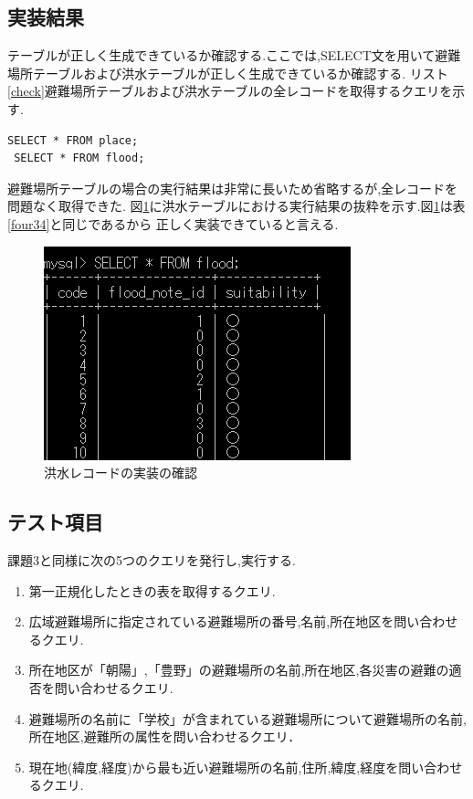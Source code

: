 \documentclass[a4j]{jarticle}
\begin{document}
    \subsection{実装結果}
    テーブルが正しく生成できているか確認する.ここでは,SELECT文を用いて避難場所テーブルおよび洪水テーブルが正しく生成できているか確認する.
      リスト\ref{check}避難場所テーブルおよび洪水テーブルの全レコードを取得するクエリを示す.
      \begin{lstlisting}[basicstyle=\ttfamily\footnotesize, frame=single,label=check,caption=実装結果を確認するためのクエリ]
 SELECT * FROM place;
 SELECT * FROM flood;
                 \end{lstlisting}
    避難場所テーブルの場合の実行結果は非常に長いため省略するが,全レコードを問題なく取得できた.
    図\ref{flood}に洪水テーブルにおける実行結果の抜粋を示す.図\ref{flood}は表\ref{four34}と同じであるから
    正しく実装できていると言える.
    \begin{figure}[H]
      \centering
      \includegraphics[scale=1.0]{flood.png}
      \caption{洪水レコードの実装の確認}
       \label{flood}
      \end{figure}


    \subsection{テスト項目}
    課題3と同様に次の5つのクエリを発行し,実行する.
    \begin{enumerate}
      \item 第一正規化したときの表を取得するクエリ.
      \item 広域避難場所に指定されている避難場所の番号,名前,所在地区を問い合わせるクエリ.
      \item 所在地区が「朝陽」,「豊野」の避難場所の名前,所在地区,各災害の避難の適否を問い合わせるクエリ.
      \item 避難場所の名前に「学校」が含まれている避難場所について避難場所の名前,所在地区,避難所の属性を問い合わせるクエリ．
      \item 現在地(緯度,経度)から最も近い避難場所の名前,住所,緯度,経度を問い合わせるクエリ.
    \end{enumerate}    
\end{document}
